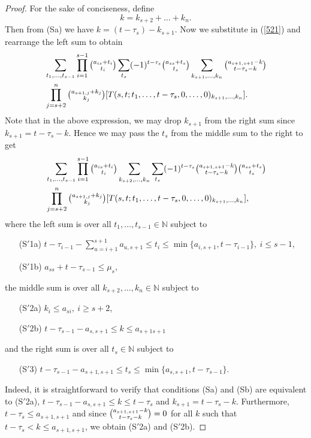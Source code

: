 \documentclass[ALCO,Unicode]{cedram}
\numberwithin{equation}{section}
\begin{document}
\begin{proof}
For the sake of conciseness, define \[k=k_{s+2}+\dots+k_n.\] Then from (Sa) we have
	 $k=(t-\tau_{s})-k_{s+1}$.
Now we substitute in (\ref{521}) and rearrange the left sum to obtain
\begin{align*}
	&\sum_{t_1,\dots,t_{s-1}}\prod_{i=1}^{s-1}\tbinom{a_{is}+t_i}{t_i} \sum_{t_s}(-1)^{t-\tau_{s}}\tbinom{a_{ss}+t_s}{t_s} \sum_{k_{s+1},\dots,k_n}\tbinom{a_{s+1,s+1}-k}{t-\tau_s -k}\\\nonumber&\prod_{j=s+2}^{n}\tbinom{a_{s+1,j}+k_{j}}{k_{j}} [T(s,t;t_1,\dots,t-\tau_s,0,\dots,0)_{k_{s+1},\dots,k_n}]. \end{align*}
Note that in the above expression, we may drop $k_{s+1}$ from the right sum since $k_{s+1}=t-\tau_s -k$. Hence we may pass the $t_s$ from the middle sum to the right to get \begin{align}\label{522}
	&\sum_{t_1,\dots,t_{s-1}}\prod_{i=1}^{s-1}\tbinom{a_{is}+t_i}{t_i} \sum_{k_{s+2},\dots,k_n}\sum_{t_s}(-1)^{t-\tau_{s}}\tbinom{a_{s+1,s+1}-k}{t-\tau_s -k}\tbinom{a_{ss}+t_s}{t_s}\\\nonumber&\prod_{j=s+2}^{n}\tbinom{a_{s+1,j}+k_{j}}{k_{j}} [T(s,t;t_1,\dots,t-\tau_s,0,\dots,0)_{k_{s+1},\dots,k_n}], \end{align}
	where the left sum is over all  $t_1,\dots,t_{s-1} \in \mathbb{N}$ subject to \begin{enumerate} \item[(S$'$1a)] $t-\tau_{i-1}-\sum_{u=i+1}^{s+1}a_{u,s+1} \le t_i\le \min\{a_{i,s+1},t-\tau_{i-1}\}, \ i \le s-1$, \item[(S$'$1b)] $a_{ss}+t-\tau_{s-1} \le \mu_s$,\end{enumerate}
	the middle sum is over all  $k_{s+2},\dots,k_{n} \in \mathbb{N}$ subject to
	\begin{enumerate} \item[(S$'$2a)] $k_{i} \le a_{si}, \  i \ge s+2$, \item[(S$'$2b)] $t-\tau_{s-1}-a_{s,s+1} \le k \le a_{s+1s+1}$\end{enumerate} and the right sum is over all  $t_s\in \mathbb{N}$ subject to \begin{enumerate}\item[(S$'$3)] $t-\tau_{s-1}-a_{s+1,s+1} \le t_s \le \min\{a_{s,s+1}, t-\tau_{s-1}\}.$ \end{enumerate}
	Indeed, it is straightforward to verify that conditions (Sa) and (Sb) are equivalent to (S${'}$2a), $t-\tau_{s-1}-a_{s,s+1} \le k \le t - \tau_s$ and $k_{s+1}=t-\tau_s-k$. Furthermore, $t-\tau_s \le a_{s+1,s+1}$ and since $\tbinom{a_{s+1,s+1}-k}{t-\tau_s - k}=0$ for all $k$ such that $t-\tau_s < k \le a_{s+1,s+1}$, we obtain (S$'$2a) and (S$'$2b).
	

\end{proof}
\end{document}
